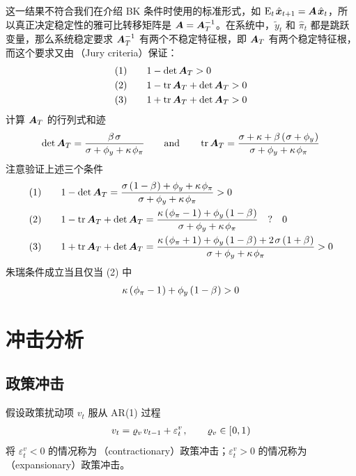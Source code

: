 这一结果不符合我们在介绍 BK 条件时使用的标准形式，如 \(\meant\,\hat{\bsx}\nt=\bsA\,\hat{\bsx}_t\)，所以真正决定稳定性的雅可比转移矩阵是 \(\bm{A}=\bm{A}^{-1}_T\)。在系统中，\(\tilde y_t\) 和 \(\hat \pi_t\) 都是跳跃变量，那么系统稳定要求 \(\bm{A}_T^{-1}\) 有两个不稳定特征根，即 \(\bm{A}_T\) 有两个稳定特征根，而这个要求又由\,（Jury criteria）保证：
\begin{align*}
    (1)\qquad & 1-\det \bm{A}_T>0\\
    (2)\qquad & 1-\operatorname{tr} \bm{A}_T+\det \bm{A}_T>0\\
    (3)\qquad & 1+\operatorname{tr} \bm{A}_T+\det \bm{A}_T>0
\end{align*}
计算 \(\bm{A}_T\) 的行列式和迹
\begin{align*}
    \det \bsA_T=\dfrac{\beta\,\sigma}{\sigma+\phi_y+\kappa\,\phi_\pi}\qquad\n{and}\qquad\tr \bsA_T=\dfrac{\sigma+\kappa+\beta\bka{\sigma+\phi_y}}{\sigma+\phi_y+\kappa\,\phi_\pi}
\end{align*}
注意验证上述三个条件
\begin{align*}
    (1)\qquad & 1-\det \bsA_T=\dfrac{\sigma\bka{1-\beta}+\phi_y+\kappa\,\phi_\pi}{\sigma+\phi_y+\kappa\,\phi_\pi}>0\\
    (2)\qquad & 1-\tr \bsA_T+\det \bsA_T=\dfrac{\kappa\bka{\phi_\pi-1}+\phi_y\bka{1-\beta}}{\sigma+\phi_y+\kappa\,\phi_\pi} \quad ? \quad 0\\
    (3)\qquad & 1+\tr \bsA_T+\det \bsA_T=\dfrac{\kappa\bka{\phi_\pi+1}+\phi_y\bka{1-\beta}+2\,\sigma\bka{1+\beta}}{\sigma+\phi_y+\kappa\,\phi_\pi}>0
\end{align*}
朱瑞条件成立当且仅当 (2) 中
\begin{align}
    \kappa\left(\mspace{1mu}\phi_\pi-1\mspace{1mu}\right)+\phi_y\left(\mspace{1mu}1-\beta\mspace{1mu}\right)>0 \label{eq:Jury-condition}
\end{align}

\section{冲击分析}

\subsection{政策冲击}

假设政策扰动项 \(v_t\) 服从 AR(1) 过程
\begin{align*}
    v_t=\varrho_v\,v\lt+\varepsilon_t^v\,,\qquad\varrho_v\in\bksa{0,1}
\end{align*}
将 \(\varepsilon^v_t<0\) 的情况称为\,（contractionary）政策冲击；\(\varepsilon^v_t>0\) 的情况称为\,（expansionary）政策冲击。

